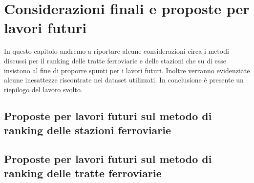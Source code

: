 \chapter{Considerazioni finali e proposte per lavori futuri}
\label{ch:conclusionilavorifuturi}

In questo capitolo andremo a riportare alcune considerazioni circa i metodi discussi per il ranking delle tratte ferroviarie e delle stazioni che su di esse insistono al fine di proporre spunti per i lavori futuri. Inoltre verranno evidenziate alcune inesattezze riscontrate nei dataset utilizzati.
\newline
In conclusione è presente un riepilogo del lavoro svolto.
\section{Proposte per lavori futuri sul metodo di ranking delle stazioni ferroviarie}
\section{Proposte per lavori futuri sul metodo di ranking delle tratte ferroviarie}
